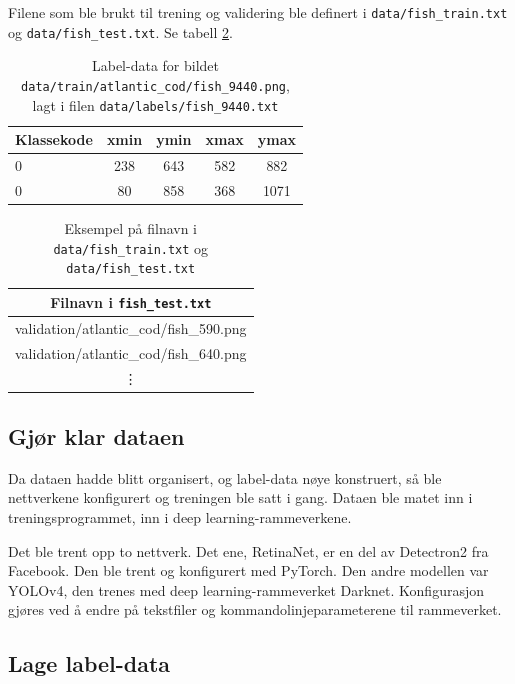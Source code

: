 Filene som ble brukt til trening og validering ble definert i \texttt{data/fish\_train.txt} og \texttt{data/fish\_test.txt}. Se tabell \ref{tab:fish}.

\begin{table}[b]
\bigskip
\centering
\caption{Label-data for bildet \texttt{data/train/atlantic\_cod/fish\_9440.png}, lagt i filen \texttt{data/labels/fish\_9440.txt}}
\label{tab:bbox} 
\begin{tabular}[t]{lcccc}
\toprule
Klassekode    & xmin      & ymin    & xmax     & ymax \\
\midrule
0 & 238 & 643 & 582 & 882 \\
0 & 80   & 858 & 368 & 1071 \\
\bottomrule	
\end{tabular}
\end{table}

\begin{table}[b]
\bigskip
\centering
\caption{Eksempel på filnavn i \texttt{data/fish\_train.txt} og \texttt{data/fish\_test.txt}}
\label{tab:fish} 
\begin{tabular}[t]{c}
\toprule
Filnavn i \texttt{fish\_test.txt} \\
\midrule
validation/atlantic\_cod/fish\_590.png \\
validation/atlantic\_cod/fish\_640.png \\
\vdots \\
\bottomrule	
\end{tabular}
\end{table}

\subsection{Gjør klar dataen}

Da dataen hadde blitt organisert, og label-data nøye konstruert, så ble nettverkene konfigurert og treningen ble satt i gang. Dataen ble matet inn i treningsprogrammet, inn i deep learning-rammeverkene.

Det ble trent opp to nettverk. Det ene, RetinaNet, er en del av Detectron2 fra Facebook. Den ble trent og konfigurert med PyTorch. Den andre modellen var YOLOv4, den trenes med deep learning-rammeverket Darknet. Konfigurasjon gjøres ved å endre på tekstfiler og kommandolinjeparameterene til rammeverket.

\subsection{Lage label-data}

